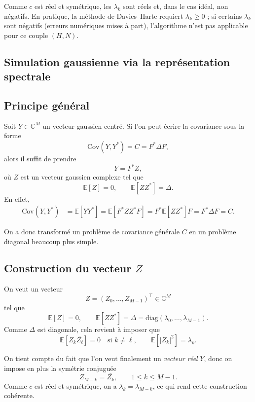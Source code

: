 \documentclass[11pt,a4paper]{article}
\newcommand{\C}{\mathbb{C}}
\newcommand{\E}{\mathbb{E}}
\newcommand{\Cov}{\mathrm{Cov}}
\newcommand{\1}{\mathbf{1}}
\begin{document}
Comme $c$ est réel et symétrique, les $\lambda_k$ sont réels et,
dans le cas idéal, non négatifs.
En pratique, la méthode de Davies--Harte requiert $\lambda_k\ge 0$ ;
si certains $\lambda_k$ sont négatifs (erreurs numériques mises à part),
l'algorithme n'est pas applicable pour ce couple $(H,N)$.

\subsection{Simulation gaussienne via la représentation spectrale}

\subsection{Principe général}

Soit $Y\in\C^M$ un vecteur gaussien centré.
Si l'on peut écrire la covariance sous la forme
\[
  \Cov(Y,Y^\ast) = C = F^\ast \Delta F,
\]
alors il suffit de prendre
\begin{equation}
  Y = F^\ast Z,
\end{equation}
où $Z$ est un vecteur gaussien complexe tel que
\[
  \E[Z]=0,\qquad \E[Z Z^\ast] = \Delta.
\]
En effet,
\begin{align}
  \Cov(Y,Y^\ast)
  &= \E[YY^\ast]
   = \E[F^\ast Z Z^\ast F]
   = F^\ast \E[Z Z^\ast] F
   = F^\ast \Delta F
   = C.
\end{align}

On a donc transformé un problème de covariance générale $C$
en un problème diagonal beaucoup plus simple.

\subsection{Construction du vecteur $Z$}

On veut un vecteur
\[
  Z = (Z_0,\dots,Z_{M-1})^\top \in\C^M
\]
tel que
\[
  \E[Z]=0,\qquad \E[Z Z^\ast] = \Delta
  = \mathrm{diag}(\lambda_0,\dots,\lambda_{M-1}).
\]
Comme $\Delta$ est diagonale, cela revient à imposer que
\[
  \E[Z_k \overline{Z_\ell}] = 0\quad\text{si }k\ne\ell,
  \qquad
  \E[|Z_k|^2] = \lambda_k.
\]

On tient compte du fait que l'on veut finalement un \emph{vecteur réel}
$Y$, donc on impose en plus la symétrie conjuguée
\begin{equation}
  Z_{M-k} = \overline{Z_k},\qquad 1\le k\le M-1.
\end{equation}
Comme $c$ est réel et symétrique, on a $\lambda_k = \lambda_{M-k}$,
ce qui rend cette construction cohérente.
\end{document}
